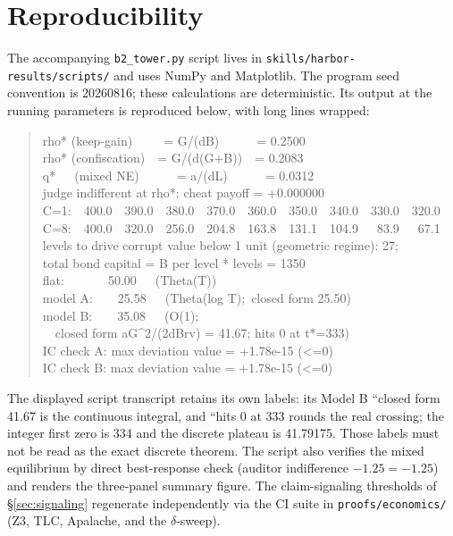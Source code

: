 \documentclass[11pt,a4paper]{article}
\begin{document}
\section{Reproducibility}\label{sec:repro}
The accompanying \texttt{b2\_\allowbreak tower.py} script lives in
\texttt{skills/\allowbreak harbor-results/\allowbreak scripts/} and uses NumPy
and Matplotlib. The program seed convention is 20260816; these calculations
are deterministic. Its output at the running parameters is reproduced below,
with long lines wrapped:
\begin{quote}\small\ttfamily
rho* (keep-gain)~~~~~= G/(dB)~~~~~~= 0.2500 \\
rho* (confiscation)~~= G/(d(G+B))~~= 0.2083 \\
q*~~~(mixed NE)~~~~~~= a/(dL)~~~~~~= 0.0312 \\
judge indifferent at rho*: cheat payoff = +0.000000 \\
C=1:~~400.0~~390.0~~380.0~~370.0~~360.0~~350.0~~340.0~~330.0~~320.0 \\
C=8:~~400.0~~320.0~~256.0~~204.8~~163.8~~131.1~~104.9~~~83.9~~~67.1 \\
levels to drive corrupt value below 1 unit (geometric regime): 27; \\
total bond capital = B per level * levels = 1350 \\
flat:~~~~~~~50.00~~~(Theta(T)) \\
model A:~~~~25.58~~~(Theta(log T);~closed form 25.50) \\
model B:~~~~35.08~~~(O(1); \\
~~closed form aG\^{}2/(2dBrv) = 41.67; hits 0 at t*=333) \\
IC check A: max deviation value = +1.78e-15 (<=0) \\
IC check B: max deviation value = +1.78e-15 (<=0)
\end{quote}
The displayed script transcript retains its own labels: its Model B ``closed form 41.67 is the continuous integral, and ``hits 0 at 333 rounds the real crossing; the integer first zero is 334 and the discrete plateau is 41.79175. Those labels must not be read as the exact discrete theorem. The script also verifies the mixed equilibrium by direct best-response check (auditor indifference $-1.25 = -1.25$) and renders the three-panel summary figure. The claim-signaling thresholds of \S\ref{sec:signaling} regenerate independently via the CI suite in \texttt{proofs/\allowbreak economics/\allowbreak } (Z3, TLC, Apalache, and the $\delta$-sweep).
\end{document}
